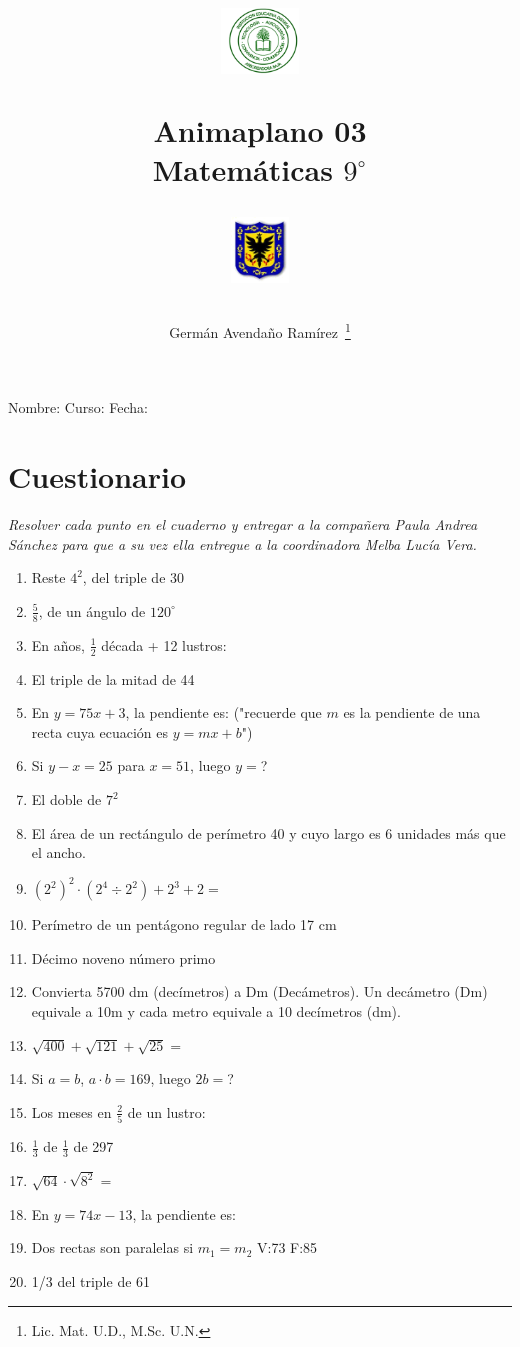 \documentclass[11pt,twoside,letter]{article}
\author{Germ\'an Avenda\~no Ram\'irez~\thanks{Lic. Mat. U.D., M.Sc. U.N.}}
\title{\begin{minipage}{.2\textwidth}
\includegraphics[height=1.75cm]{Images/logo-colegio.png}\end{minipage}
\begin{minipage}{.55\textwidth}
\begin{center}
Animaplano 03\\
Matemáticas $9^{\circ}$
\end{center}
\end{minipage}\hfill
\begin{minipage}{.2\textwidth}
\includegraphics[height=1.75cm]{Images/logo-sed.png} 
\end{minipage}}
\date{}
\begin{document}
\maketitle
Nombre: \hrulefill Curso: \underline{\hspace*{44pt}} Fecha: \underline{\hspace*{2.5cm}}
\section*{Cuestionario}
\textit{Resolver cada punto en el cuaderno y entregar a la compañera Paula Andrea Sánchez para que a su vez ella entregue a la coordinadora Melba Lucía Vera.}
\begin{enumerate}
 \item Reste $4^{2}$, del triple de 30
 \item $\frac{5}{8}$, de un ángulo de $120^{\circ}$
 \item En años, $\frac{1}{2}$ década + 12 lustros:
 \item El triple de la mitad de 44
 \item En $y=75x+3$, la pendiente es: ("recuerde que $m$ es la pendiente de una recta cuya ecuaci\'{o}n es $y=mx+b$")
 \item Si $y-x=25$ para $x=51$, luego $y=$?
 \item El doble de $7^{2}$
 \item El área de un rectángulo de perímetro 40 y cuyo largo es 6 unidades más que el ancho.
 \item $(2^{2})^{2}\cdot (2^{4}\div 2^{2})+2^{3}+2=$
 \item Perímetro de un pentágono regular de lado 17 cm
 \item Décimo noveno número primo
 \item Convierta 5700 dm (decímetros) a Dm (Decámetros). Un decámetro (Dm) equivale a 10m y cada metro equivale a 10 decímetros (dm).
 \item $\sqrt{400}+\sqrt{121}+\sqrt{25}=$
 \item Si $a=b$, $a\cdot b=169$, luego $2b=$?
 \item Los meses en $\frac{2}{5}$ de un lustro:
 \item $\frac{1}{3}$ de $\frac{1}{3}$ de 297
 \item $\sqrt{64}\cdot \sqrt{8^{2}}=$
 \item En $y=74x-13$, la pendiente es:
 \item Dos rectas son paralelas si $m_{1}=m_{2}$ V:73 \quad F:85
 \item 1/3 del triple de 61

\end{enumerate}
\end{document}

